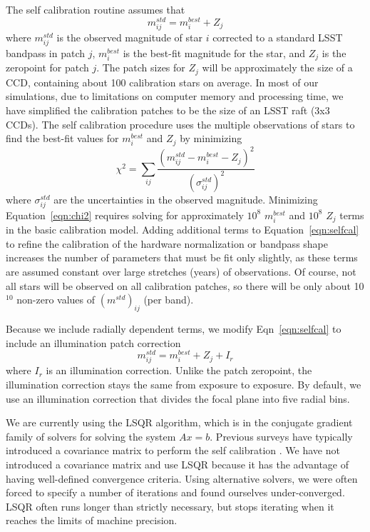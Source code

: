 \documentclass[12pt,preprint]{aastex}
\begin{document}
The self calibration routine assumes that
\begin{equation} \label{eqn:selfcal}
m_{ij}^{std} = m_i^{best}+Z_j
\end{equation}
where $m_{ij}^{std}$ is the observed magnitude of star $i$ corrected
to a standard LSST bandpass in patch $j$, $m_i^{best}$ is the best-fit
magnitude for the star, and $Z_j$ is the zeropoint for patch $j$. The
patch sizes for $Z_j$ will be approximately the size of a CCD,
containing about 100 calibration stars on average. In most of our
simulations, due to limitations on computer memory and processing
time, we have simplified the calibration patches to be the size of an
LSST raft (3x3 CCDs). The self calibration procedure uses the multiple
observations of stars to find the best-fit values for $m_i^{best}$ and
$Z_j$ by minimizing
\begin{equation} \label{eqn:chi2}
\chi^2 = \sum_{ij} \frac{(m^{std}_{ij}-m_{i}^{best}-Z_j)^2}{(\sigma_{ij}^{std})^2}
\end{equation}  
where $\sigma_{ij}^{std}$ are the uncertainties in the observed
magnitude.  Minimizing Equation~\ref{eqn:chi2} requires solving for
approximately $10^8$ $m_{i}^{best}$ and $10^8$ $Z_j$ terms in the
basic calibration model. Adding additional terms to
Equation~\ref{eqn:selfcal} to refine the calibration of the hardware
normalization or bandpass shape increases the number of parameters
that must be fit only slightly, as these terms are assumed constant
over large stretches (years) of observations. Of course, not all stars
will be observed on all calibration patches, so there will be only
about 10$^{10}$ non-zero values of $(m^{std})_{ij}$ (per band).

Because we include radially dependent terms, we modify Eqn~\ref{eqn:selfcal} to include an illumination patch correction
\begin{equation}
m_{ij}^{std} = m_i^{best}+Z_j+I_r
\end{equation}
where $I_r$ is an illumination correction.  Unlike the patch zeropoint, the illumination correction stays the same from exposure to exposure.  By default, we use an illumination correction that divides the focal plane into five radial bins.  

We are currently using the LSQR algorithm, which is in the conjugate gradient
family of solvers for solving the system $Ax=b$.  Previous surveys
have typically introduced a covariance matrix to perform the
self calibration \citep{pad08,Schaf12}.  We have not introduced a
covariance matrix and use LSQR because it has the advantage of having
well-defined convergence criteria.  Using alternative solvers, we were
often forced to specify a number of iterations and found ourselves
under-converged.  LSQR often runs longer than strictly necessary, but
stops iterating when it reaches the limits of machine precision.
\end{document}
